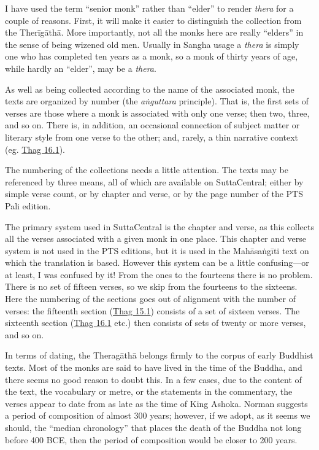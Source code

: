 \documentclass[12pt,openany]{book}%
\begin{document}
I have used the term “senior monk” rather than “elder” to render \textit{thera} for a couple of reasons. First, it will make it easier to distinguish the collection from the \textsanskrit{Therīgāthā}. More importantly, not all the monks here are really “elders” in the sense of being wizened old men. Usually in Sangha usage a \textit{thera} is simply one who has completed ten years as a monk, so a monk of thirty years of age, while hardly an “elder”, may be a \textit{thera}.

As well as being collected according to the name of the associated monk, the texts are organized by number (the \textit{\textsanskrit{aṅguttara}} principle). That is, the first sets of verses are those where a monk is associated with only one verse; then two, three, and so on. There is, in addition, an occasional connection of subject matter or literary style from one verse to the other; and, rarely, a thin narrative context (eg. \href{https://suttacentral.net/thag16.1}{Thag 16.1}).

The numbering of the collections needs a little attention. The texts may be referenced by three means, all of which are available on SuttaCentral; either by simple verse count, or by chapter and verse, or by the page number of the PTS Pali edition.

The primary system used in SuttaCentral is the chapter and verse, as this collects all the verses associated with a given monk in one place. This chapter and verse system is not used in the PTS editions, but it is used in the \textsanskrit{Mahāsaṅgīti} text on which the translation is based. However this system can be a little confusing—or at least, I was confused by it! From the ones to the fourteens there is no problem. There is no set of fifteen verses, so we skip from the fourteens to the sixteens. Here the numbering of the sections goes out of alignment with the number of verses: the fifteenth section (\href{https://suttacentral.net/thag15.1}{Thag 15.1}) consists of a set of sixteen verses. The sixteenth section (\href{https://suttacentral.net/thag16.1}{Thag 16.1} etc.) then consists of sets of twenty or more verses, and so on.

In terms of dating, the \textsanskrit{Theragāthā} belongs firmly to the corpus of early Buddhist texts. Most of the monks are said to have lived in the time of the Buddha, and there seems no good reason to doubt this. In a few cases, due to the content of the text, the vocabulary or metre, or the statements in the commentary, the verses appear to date from as late as the time of King Ashoka. Norman suggests a period of composition of almost 300 years; however, if we adopt, as it seems we should, the “median chronology” that places the death of the Buddha not long before 400 BCE, then the period of composition would be closer to 200 years.
\end{document}
